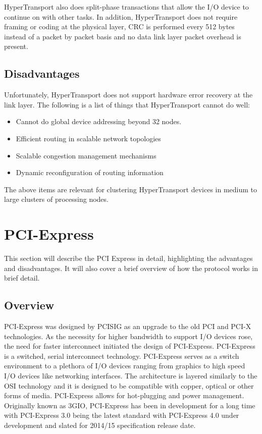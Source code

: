 \documentclass[conference]{IEEEtran}
\begin{document}
\bigskip

HyperTransport also does split-phase transactions that allow the I/O device to
continue on with other tasks. In addition, HyperTransport does not require framing or coding at the physical
layer, CRC is performed every 512 bytes instead of a packet by packet basis and
no data link layer packet overhead is present.

\subsection{Disadvantages}
\label{subsec:ht:disadv}
Unfortunately, HyperTransport does not support hardware error recovery at the
link layer. The following is a list of things that HyperTransport cannot do
well:

\begin{itemize}
  \item Cannot do global device addressing beyond 32 nodes.
  \item Efficient routing in scalable network topologies
  \item Scalable congestion management mechanisms
  \item Dynamic reconfiguration of routing information
\end{itemize}

The above items are relevant for clustering HyperTransport devices in medium to
large clusters of processing nodes\cite{duato2009extending}. 

\section{PCI-Express}
This section will describe the PCI Express in detail,
highlighting the advantages and disadvantages. It will also cover a brief
overview of how the protocol works in brief detail. 
\subsection{Overview}
PCI-Express was designed by PCISIG as an upgrade to the old PCI and PCI-X
technologies. As the necessity for higher bandwidth to support I/O devices rose, the need for faster interconnect
initiated the design of PCI-Express. PCI-Express is a switched, serial
interconnect technology. PCI-Express serves as a switch environment to a
plethora of I/O devices ranging from graphics to high speed I/O devices like
networking interfaces. The architecture is layered similarly to the OSI
technology and it is designed to be compatible with copper, optical or other
forms of media\cite{paulson2003ins}. PCI-Express allows for hot-plugging and
power management. Originally known as 3GIO, PCI-Express has been in development
for a long time with PCI-Express 3.0 being the latest standard with PCI-Express
4.0 under development and slated for 2014/15 specification release date. 
\end{document}
